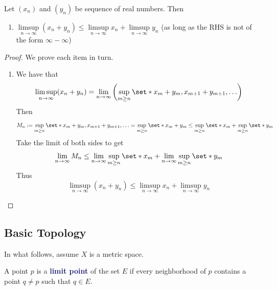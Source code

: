 \documentclass[11pt]{article}
\numberwithin{equation}{section}
\newcommand{\navy}[1]{\textcolor{MidnightBlue}{\bf #1}}
\theoremstyle{definition}
\theoremstyle{definition}
\newcommand\parens[1]{\left( #1 \right)}
\def\Set{\set*}%
\newcommand{\1}{\mathbbm 1}
\begin{document}
\begin{theorem}
	Let $\parens{x_n}$ and $\parens{y_n}$ be sequence of real numbers. Then
	\begin{enumerate}
		\item $\limsup\limits_{n \to \infty}(x_n + y_n) \leq \limsup\limits_{n \to \infty} x_n + \limsup\limits_{n \to \infty} y_n$ (as long as the RHS is not of the form $\infty - \infty$)
	\end{enumerate}
\end{theorem}
\begin{proof}
	We prove each item in turn.
	\begin{enumerate}
		\item We have that
		\begin{equation}
			\limsup\limits_{n \to \infty}(x_n + y_n) = \lim_{n \to \infty}\parens{\sup_{m \geq n}\Set{x_m + y_m, x_{m+1} + y_{m+1}, \ldots}}
		\end{equation}
		Then 
		\begin{equation}
			M_n := \sup_{m \geq n}\Set{x_m + y_m, x_{m+1} + y_{m+1}, \ldots} = \sup_{m \geq n}\Set{x_m + y_m} \leq \sup_{m \geq n}\Set{x_m} + \sup_{m \geq n}\Set{y_m}
		\end{equation}
		Take the limit of both sides to get
		\begin{equation}
			\lim_{n \to \infty} M_n \leq \lim_{n \to \infty} \sup_{m \geq n} \Set{x_m} + \lim_{n \to \infty} \sup_{m \geq n} \Set{y_m}
		\end{equation}
		Thus 
		\begin{equation}
			\limsup\limits_{n \to \infty}(x_n + y_n) \leq \limsup\limits_{n \to \infty} x_n + \limsup\limits_{n \to \infty} y_n
		\end{equation}
	\end{enumerate}
\end{proof}



\subsection{Basic Topology}

In what follows, assume $X$ is a metric space. 

\begin{definition}
	A point $p$ is a \navy{limit point} of the set $E$ if every neighborhood of $p$ contains a point $q \neq p$ such that $q \in E$.
\end{definition}
\end{document}

